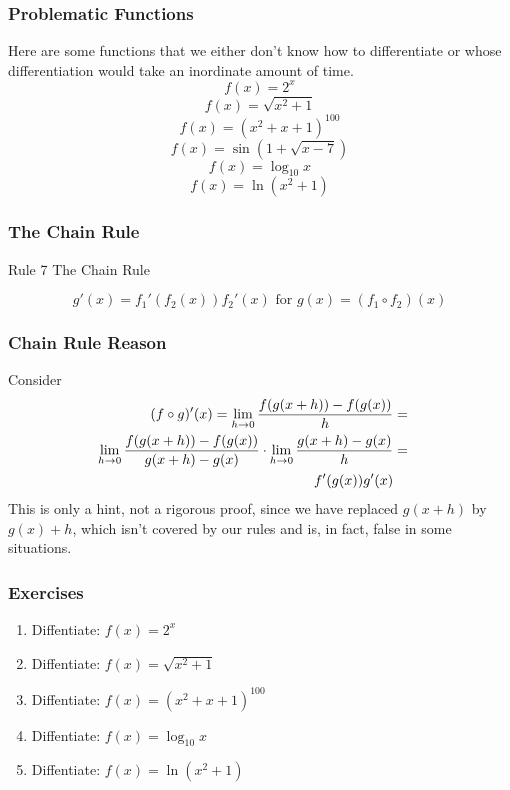 \documentclass[xcolor=dvipsnames]{beamer}
\begin{document}
\begin{frame}
  \frametitle{Problematic Functions}
Here are some functions that we either don't know how to differentiate
or whose differentiation would take an inordinate amount of time.
\begin{equation}
  \label{eq:faegeehi}
f(x)=2^{x}
\end{equation}
\begin{equation}
  \label{eq:kooteiju}
f(x)=\sqrt{x^{2}+1}
\end{equation}
\begin{equation}
  \label{eq:oochahph}
f(x)=(x^{2}+x+1)^{100}
\end{equation}
\begin{equation}
  \label{eq:bongaeza}
f(x)=\sin(1+\sqrt{x-7})
\end{equation}
\begin{equation}
  \label{eq:ooquonge}
f(x)=\log_{10}x
\end{equation}
\begin{equation}
  \label{eq:iejafaic}
f(x)=\ln(x^{2}+1)
\end{equation}
\end{frame}

\begin{frame}
  \frametitle{The Chain Rule}
  \begin{block}{Rule 7}
The Chain Rule
  \end{block}
\begin{equation}
  \label{eq:aepuaxai}
g'(x)=f_{1}'(f_{2}(x))f_{2}'(x)\mbox{ for }g(x)=(f_{1}\circ{}f_{2})(x)
\end{equation}
\end{frame}

\begin{frame}
  \frametitle{Chain Rule Reason}
Consider
\begin{align}
  \label{eq:prf}
  (f\circ{}g)'(x)=\lim_{h\rightarrow{}0}\frac{f(g(x+h))-f(g(x))}{h}&=&\notag \\
  \lim_{h\rightarrow{}0}\frac{f(g(x+h))-f(g(x))}{g(x+h)-g(x)}\cdot\lim_{h\rightarrow{}0}\frac{g(x+h)-g(x)}{h}&=& \\
  f'(g(x))g'(x)&&
\end{align}
This is only a hint, not a rigorous proof, since we have replaced
$g(x+h)$ by $g(x)+h$, which isn't covered by our rules and is, in
fact, false in some situations.
\end{frame}

\begin{frame}
  \frametitle{Exercises}
  \begin{enumerate}
  \item<1-> Diffentiate: $f(x)=2^{x}$
  \item<2-> Diffentiate: $f(x)=\sqrt{x^{2}+1}$
  \item<3-> Diffentiate: $f(x)=(x^{2}+x+1)^{100}$
  \item<4-> Diffentiate: $f(x)=\log_{10}x$
  \item<5-> Diffentiate: $f(x)=\ln(x^{2}+1)$
  \end{enumerate}
\end{frame}
\end{document}
